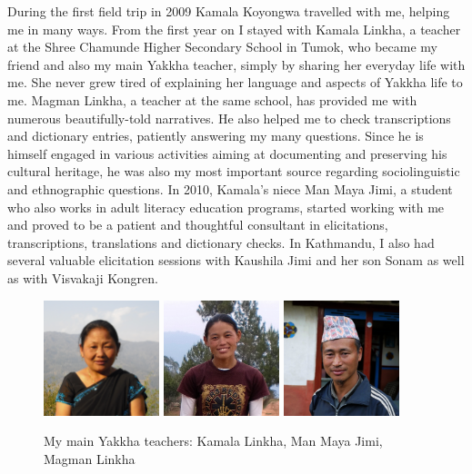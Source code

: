 During the first field trip in 2009 Kamala Koyongwa travelled with me, helping me in many ways. From the first year on I stayed with Kamala Linkha, a teacher at the Shree Chamunde Higher Secondary School in Tumok, who became my friend and also my main Yakkha teacher, simply by sharing her everyday life with me. She  never grew tired of explaining her language and aspects of Yakkha life to me.  Magman Linkha, a teacher at the same school, has provided me with numerous beautifully-told narratives. He also  helped me to check transcriptions and dictionary entries, patiently answering my many questions. Since he is himself engaged in various activities aiming at documenting and preserving his cultural heritage, he was also my most important source regarding socio\-linguistic and ethnographic questions. In 2010, Kamala's niece Man Maya Jimi, a student who also works in adult literacy education programs, started working with me and proved to be a patient and thoughtful consultant in elicitations, transcriptions, translations and dictionary checks. In Kathmandu, I also had several valuable elicitation sessions with Kaushila Jimi and her son Sonam as well as with Visvakaji Kongren.


 \begin{figure}
 \includegraphics[width=0.30\textwidth]{figures/kamala.jpg}
 \hfill
 \includegraphics[width=0.30\textwidth]{figures/manmaya.jpg}
 \hfill
 \includegraphics[width=0.30\textwidth]{figures/magman.jpg}
 \caption{My main Yakkha teachers: Kamala Linkha, Man Maya Jimi, Magman Linkha}
 \end{figure}

